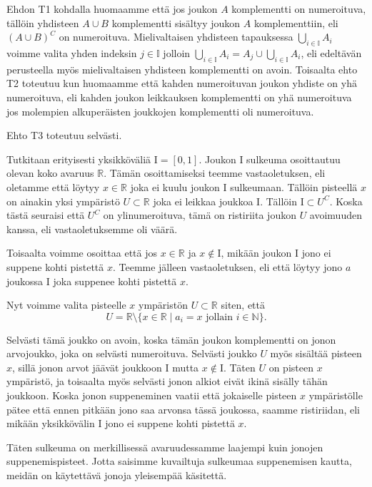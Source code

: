 \documentclass[12pt,a4paper,leqno]{report}
\newcommand{\R}{\mathbb{R}}
\newcommand{\N}{\mathbb{N}}
\newcommand{\I}{\mathrm{I}}
\theoremstyle{plain}
\theoremstyle{definition}
\theoremstyle{remark}
\begin{document}
Ehdon T1 kohdalla huomaamme että jos joukon $A$ komplementti on numeroituva, tällöin yhdisteen $A \cup B$ komplementti sisältyy joukon $A$ komplementtiin, eli $(A \cup B)^C$ on numeroituva. Mielivaltaisen yhdisteen tapauksessa $\bigcup_{i \in \mathbb{I}} A_i$ voimme valita yhden indeksin $j \in \mathbb{I}$ jolloin $\bigcup_{i \in \mathbb{I}} A_i = A_j \cup\bigcup_{i \in \mathbb{I}} A_i$, eli edeltävän perusteella myös mielivaltaisen yhdisteen komplementti on avoin. Toisaalta ehto T2 toteutuu kun huomaamme että kahden numeroituvan joukon yhdiste on yhä numeroituva, eli kahden joukon leikkauksen komplementti on yhä numeroituva jos molempien alkuperäisten joukkojen komplementti oli numeroituva.

Ehto T3 toteutuu selvästi.

Tutkitaan erityisesti yksikköväliä $\I = [0,1]$. Joukon $\I$ sulkeuma osoittautuu olevan koko avaruus $\R$. Tämän osoittamiseksi teemme vastaoletuksen, eli oletamme että löytyy $x \in \R$ joka ei kuulu joukon $\I$ sulkeumaan. Tällöin pisteellä $x$ on ainakin yksi ympäristö $U \subset \R$ joka ei leikkaa joukkoa $\I$. Tällöin $\I \subset U^C$. Koska tästä seuraisi että $U^C$ on ylinumeroituva, tämä on ristiriita joukon $U$ avoimuuden kanssa, eli vastaoletuksemme oli väärä.

Toisaalta voimme osoittaa että jos $x \in \R$ ja $x \not\in \I$, mikään joukon $\I$ jono ei suppene kohti pistettä $x$. Teemme jälleen vastaoletuksen, eli että löytyy jono $a$ joukossa $\I$ joka suppenee kohti pistettä $x$.

Nyt voimme valita pisteelle $x$ ympäristön $U \subset \R$ siten, että
\begin{equation}
U = \R \setminus \{x \in \R \mid a_i = x \text{ jollain } i \in \N \}\text{.}
\end{equation}

Selvästi tämä joukko on avoin, koska tämän joukon komplementti on jonon arvojoukko, joka on selvästi numeroituva. Selvästi joukko $U$ myös sisältää pisteen $x$, sillä jonon arvot jäävät joukkoon $\I$ mutta $x \not\in \I$. Täten $U$ on pisteen $x$ ympäristö, ja toisaalta myös selvästi jonon alkiot eivät ikinä sisälly tähän joukkoon. Koska jonon suppeneminen vaatii että jokaiselle pisteen $x$ ympäristölle pätee että ennen pitkään jono saa arvonsa tässä joukossa, saamme ristiriidan, eli mikään yksikkövälin $\I$ jono ei suppene kohti pistettä $x$.

Täten sulkeuma on merkillisessä avaruudessamme laajempi kuin jonojen suppenemispisteet. Jotta saisimme kuvailtuja sulkeumaa suppenemisen kautta, meidän on käytettävä jonoja yleisempää käsitettä.
\end{document}
